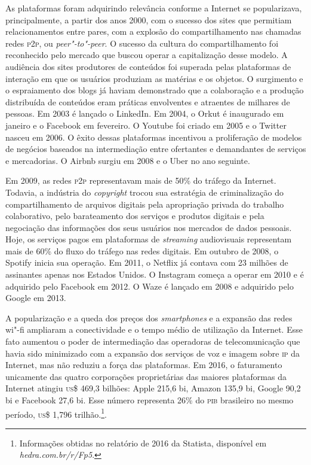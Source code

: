 As plataformas foram adquirindo relevância conforme a Internet se
popularizava, principalmente, a partir dos anos 2000, com o sucesso dos
sites que permitiam relacionamentos entre pares, com a explosão do
compartilhamento nas chamadas redes \textsc{p2p}, ou \textit{peer"-to"-peer}. O sucesso da
cultura do compartilhamento foi reconhecido pelo mercado que buscou
operar a capitalização desse modelo. A audiência dos sites produtores de
conteúdos foi superada pelas plataformas de interação em que os usuários
produziam as matérias e os objetos. O surgimento e o espraiamento dos
blogs já haviam demonstrado que a colaboração e a produção distribuída
de conteúdos eram práticas envolventes e atraentes de milhares de
pessoas. Em 2003 é lançado o LinkedIn. Em 2004, o Orkut é inaugurado em
janeiro e o Facebook em fevereiro. O Youtube foi criado em 2005 e o
Twitter nasceu em 2006. O êxito dessas plataformas incentivou a
proliferação de modelos de negócios baseados na intermediação entre
ofertantes e demandantes de serviços e mercadorias. O Airbnb surgiu em
2008 e o Uber no ano seguinte.

Em 2009, as redes \textsc{p2p} representavam mais de 50\% do tráfego da Internet.
Todavia, a indústria do \textit{copyright} trocou sua estratégia de
criminalização do compartilhamento de arquivos digitais pela apropriação
privada do trabalho colaborativo, pelo barateamento dos serviços e
produtos digitais e pela negociação das informações dos seus usuários
nos mercados de dados pessoais. Hoje, os serviços pagos em plataformas
de \textit{streaming} audiovisuais representam mais de 60\% do fluxo do tráfego
nas redes digitais. Em outubro de 2008, o Spotify inicia sua operação.
Em 2011, o Netflix já contava com 23 milhões de assinantes apenas nos
Estados Unidos. O Instagram começa a operar em 2010 e é adquirido pelo
Facebook em 2012. O Waze é lançado em 2008 e adquirido pelo Google em
2013.

\textls[-10]A popularização e a queda dos preços dos \textit{smartphones} e a expansão das redes wi"-fi ampliaram a conectividade e o tempo médio de utilização da Internet. Esse fato aumentou o poder de intermediação das operadoras de telecomunicação que havia sido minimizado com a expansão dos serviços de voz e imagem sobre \textsc{ip} da Internet, mas não reduziu a força das plataformas. Em 2016, o faturamento unicamente das quatro corporações proprietárias das maiores plataformas da Internet atingiu \textsc{us}\$ 469,3 bilhões: Apple 215,6 bi, Amazon 135,9 bi, Google 90,2 bi e Facebook 27,6 bi. Esse número representa 26\% do \textsc{pib} brasileiro no mesmo período, \textsc{us}\$ 1,796 trilhão.\footnote{Informações obtidas no relatório de 2016 da Statista, disponível em \textit{hedra.com.br/r/Fp5}.}.

